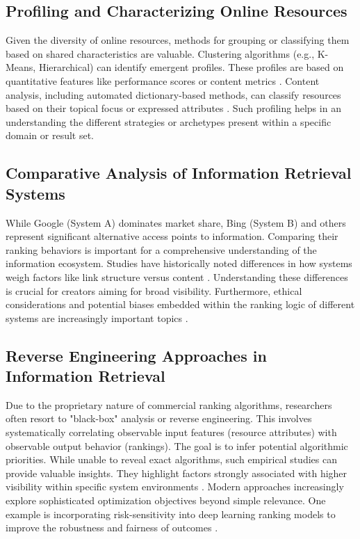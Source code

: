 \documentclass[a4paper,fleqn]{cas-sc}
\begin{document}
\subsection{Profiling and Characterizing Online Resources}
\label{subsec:lit_profiling}
Given the diversity of online resources, methods for grouping or classifying them based on shared characteristics are valuable. Clustering algorithms (e.g., K-Means, Hierarchical) can identify emergent profiles. These profiles are based on quantitative features like performance scores or content metrics \citep{Yu2024}. Content analysis, including automated dictionary-based methods, can classify resources based on their topical focus or expressed attributes \citep{Milei2025}. Such profiling helps in an understanding the different strategies or archetypes present within a specific domain or result set.

\subsection{Comparative Analysis of Information Retrieval Systems}
\label{subsec:lit_comparison}
While Google (System A) dominates market share, Bing (System B) and others represent significant alternative access points to information. Comparing their ranking behaviors is important for a comprehensive understanding of the information ecosystem. Studies have historically noted differences in how systems weigh factors like link structure versus content \citep{Toms2004}. Understanding these differences is crucial for creators aiming for broad visibility. Furthermore, ethical considerations and potential biases embedded within the ranking logic of different systems are increasingly important topics \citep{Coghlan2025}.

\subsection{Reverse Engineering Approaches in Information Retrieval}
\label{subsec:lit_reverse}
Due to the proprietary nature of commercial ranking algorithms, researchers often resort to "black-box" analysis or reverse engineering. This involves systematically correlating observable input features (resource attributes) with observable output behavior (rankings). The goal is to infer potential algorithmic priorities. While unable to reveal exact algorithms, such empirical studies can provide valuable insights. They highlight factors strongly associated with higher visibility within specific system environments \citep{Bardas2025}. Modern approaches increasingly explore sophisticated optimization objectives beyond simple relevance. One example is incorporating risk-sensitivity into deep learning ranking models to improve the robustness and fairness of outcomes \citep{SilvaRodrigues2025}.
\end{document}

